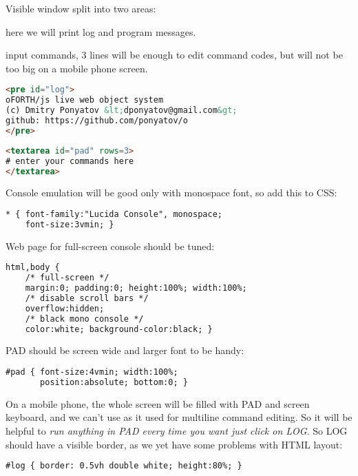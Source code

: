 \pg Visible window split into two areas:
\begin{description}[nosep]
\item[log] here we will print log and program messages.
\item[pad] input commands, 3 lines will be enough to edit command codes, but
will not be too big on a mobile phone screen.
\end{description}
\begin{lstlisting}[language=html]
<pre id="log">
oFORTH/js live web object system
(c) Dmitry Ponyatov &lt;dponyatov@gmail.com&gt;
github: https://github.com/ponyatov/o
</pre>
\end{lstlisting}
\begin{lstlisting}[language=html]
<textarea id="pad" rows=3>
# enter your commands here
</textarea>
\end{lstlisting}

\pg Console emulation will be good only with monospace font, so add this to CSS:

\begin{lstlisting}[language=html]
* { font-family:"Lucida Console", monospace;
    font-size:3vmin; }
\end{lstlisting}

\noindent
Web page for full-screen console should be tuned:
\begin{lstlisting}[language=html]
html,body {
	/* full-screen */
	margin:0; padding:0; height:100%; width:100%;
	/* disable scroll bars */
	overflow:hidden;
	/* black mono console */
	color:white; background-color:black; }
\end{lstlisting}

\pg PAD should be screen wide and larger font to be handy:
\begin{lstlisting}[language=html]
#pad { font-size:4vmin; width:100%;
       position:absolute; bottom:0; }
\end{lstlisting}

\noindent
On a mobile phone, the whole screen will be filled with PAD and screen keyboard,
and we can't use  as it used for multiline command editing. So it
will be helpful to \emph{run anything in PAD every time you want just click on
LOG}. So LOG should have a visible border, as we yet have some problems with
HTML layout:
\begin{lstlisting}[language=html]
#log { border: 0.5vh double white; height:80%; }
\end{lstlisting}

